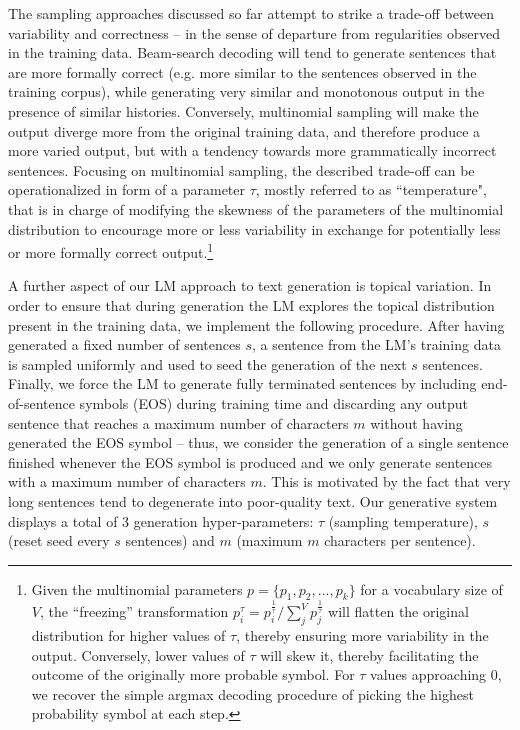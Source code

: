 \documentclass[11pt]{article}
\begin{document}
The sampling approaches discussed so far attempt to strike a trade-off  between variability and 
correctness -- in the sense of departure from regularities observed in the training data.
Beam-search decoding will tend to generate sentences that are more formally correct (e.g. more similar to the sentences observed in the training corpus), while generating very similar and monotonous output
in the presence of similar histories. Conversely, multinomial sampling will make the output diverge 
more from the original training data, and therefore produce a more varied output, but with a tendency
towards more grammatically incorrect sentences. Focusing on multinomial sampling, the described 
trade-off can be operationalized in form of a parameter $\tau$, mostly referred to as 
``temperature", that is in charge of modifying the skewness of the parameters of the multinomial 
distribution to encourage more or less variability in exchange for potentially less or more
formally correct output.\footnote{
	Given the multinomial parameters $p = \{p_1, p_2, ..., p_k\}$ for a vocabulary size of $V$,
	the ``freezing'' transformation $p_i^{\tau} = p_i^{\frac{1}{\tau}} / \sum_j^V p_j^{\frac{1}{\tau}}$
	will flatten the original distribution for higher values of $\tau$, thereby ensuring more variability
	in the output. Conversely, lower values of  $\tau$ will skew it, thereby facilitating the outcome of
	the originally more probable symbol. For $\tau$ values approaching 0, we recover the simple argmax
	decoding procedure of picking the highest probability symbol at each step. %
}

A further aspect of our LM approach to text generation is topical variation. 
In order to ensure that during generation the LM explores the topical
distribution present in the training data, we implement the following procedure.
After having generated a fixed number of sentences $s$, a sentence from the LM's training data is sampled uniformly and used to seed the generation of the next $s$ sentences. Finally, we force the LM to generate fully terminated sentences by including end-of-sentence symbols (EOS) during training time and discarding any output sentence that reaches a maximum number of characters $m$ without having
generated the EOS symbol -- thus, we consider the generation of a single sentence
finished whenever the EOS symbol is produced and we only generate sentences
with a maximum number of characters $m$. This is motivated by the fact that 
very long sentences tend to degenerate into poor-quality text. Our generative system displays a total of 3 generation hyper-parameters:
$\tau$ (sampling temperature), $s$ (reset seed every $s$ sentences)
and $m$ (maximum $m$ characters per sentence).
\end{document}
